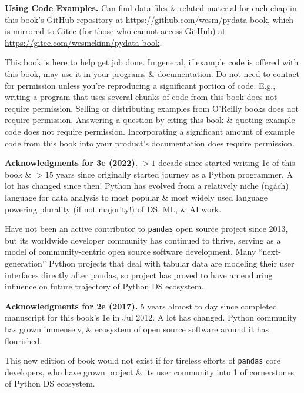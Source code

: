 \documentclass{article}
\begin{document}
\begin{enumerate}
	{\bf Using Code Examples.} Can find data files \& related material for each chap in this book's GitHub repository at \url{https://github.com/wesm/pydata-book}, which is mirrored to Gitee (for those who cannot access GitHub) at \url{https://gitee.com/wesmckinn/pydata-book}.
	
	This book is here to help get job done. In general, if example code is offered with this book, may use it in your programs \& documentation. Do not need to contact for permission unless you're reproducing a significant portion of code. E.g., writing a program that uses several chunks of code from this book does not require permission. Selling or distributing examples from O'Reilly books does not require permission. Answering a question by citing this book \& quoting example code does not require permission. Incorporating a significant amount of example code from this book into your product's documentation does require permission.
	
	{\bf Acknowledgments for 3e (2022).} $> 1$ decade since started writing 1e of this book \& $> 15$ years since originally started journey as a Python programmer. A lot has changed since then! Python has evolved from a relatively niche (ngách) language for data analysis to most popular \& most widely used language powering plurality (if not majority!) of DS, ML, \& AI work.
	
	Have not been an active contributor to {\tt pandas} open source project since 2013, but its worldwide developer community has continued to thrive, serving as a model of community-centric open source software development. Many ``next-generation'' Python projects that deal with tabular data are modeling their user interfaces directly after pandas, so project has proved to have an enduring influence on future trajectory of Python DS ecosystem.
	
	{\bf Acknowledgments for 2e (2017).} 5 years almost to day since completed manuscript for this book's 1e in Jul 2012. A lot has changed. Python community has grown immensely, \& ecosystem of open source software around it has flourished.
	
	This new edition of book would not exist if for tireless efforts of {\tt pandas} core developers, who have grown project \& its user community into 1 of cornerstones of Python DS ecosystem.
	

\end{enumerate}
\end{document}
